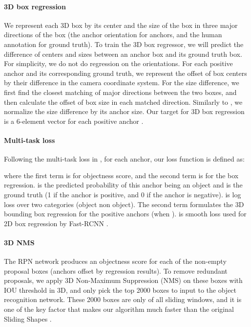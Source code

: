 \documentclass[10pt,twocolumn,letterpaper]{article}
\begin{document}
\vspace{-4mm}\paragraph{3D box regression}
We represent each 3D box by 
its center  and the size of the box  in three major directions of the box (the anchor orientation for anchors, and the human annotation for ground truth).
To train the 3D box regressor, we will predict the difference of centers and sizes between an anchor box and its ground truth box.
For simplicity, we do not do regression on the orientations.
For each positive anchor and its corresponding ground truth,
we represent the offset of box centers by their difference  in the camera coordinate system.
For the size difference,
we first find the closest matching of major directions between the two boxes, and then calculate 
the offset of box size  in each matched direction. 
Similarly to \cite{FasterRCNN}, we normalize the size difference by its anchor size. 
Our target for 3D box regression is a 6-element vector for each positive anchor
.



\vspace{-4mm}\paragraph{Multi-task loss}
Following the multi-task loss in \cite{FastRCNN,FasterRCNN}, for each anchor, 
our loss function is defined as:
\vspace{-1mm}

where the first term is for objectness score, and the second term is for the box regression.
 is the predicted probability of this anchor being an object and  is the ground truth (1 if the anchor is positive, and 0 if the anchor is negative).
 is log loss over two categories (object \vs non object).
The second term formulates the 3D bounding box regression for the positive anchors (when ). 
 is smooth  loss used for 2D box regression by Fast-RCNN \cite{FastRCNN}. 


\vspace{-4mm}\paragraph{3D NMS}
The RPN network produces an objectness score for each of the  non-empty proposal boxes (anchors offset by regression results).
To remove redundant proposals, we apply 3D Non-Maximum Suppression (NMS) on these boxes with IOU threshold  in 3D,
and only pick the top 2000 boxes to input to the object recognition network. These 2000 boxes are only  of all sliding windows, and it is one of the key factor that makes our algorithm much faster than the original Sliding Shapes \cite{SlidingShapes}. 
\end{document}
